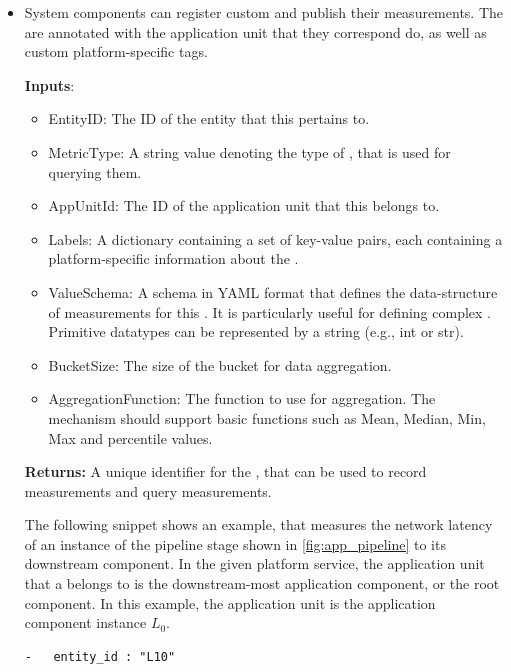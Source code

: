 \begin{itemize}
\item {} System components can register custom  and publish their measurements. The  are annotated with the application unit that they correspond do, as well as custom platform-specific tags. 
\par \noindent \textbf{Inputs}:
\begin{itemize}
\item EntityID: The ID of the entity that this  pertains to.
\item MetricType: A string value denoting the type of , that is used for querying them.
\item AppUnitId: The ID of the application unit that this  belongs to.
\item Labels: A dictionary containing a set of key-value pairs, each containing a platform-specific information about the .
\item ValueSchema: A schema in YAML format that defines the data-structure of measurements for this . It is particularly useful for defining complex . Primitive datatypes can be represented by a string (e.g., int or str).
\item BucketSize: The size of the bucket for data aggregation.
\item AggregationFunction: The function to use for aggregation. The mechanism should support basic functions such as Mean, Median, Min, Max and percentile values.
\end{itemize}
\par \noindent \textbf{Returns: } A unique identifier for the , that can be used to record measurements and query measurements.
\par The following snippet shows an example, that measures the network latency of an instance of the pipeline stage shown in \cref{fig:app_pipeline} to its downstream component. In the given platform service, the application unit that a  belongs to is the downstream-most application component, or the root component. In this example, the application unit is the application component instance $L_0$. 
\begin{verbatim}
-   entity_id : "L10"

\end{verbatim}
\end{itemize}
